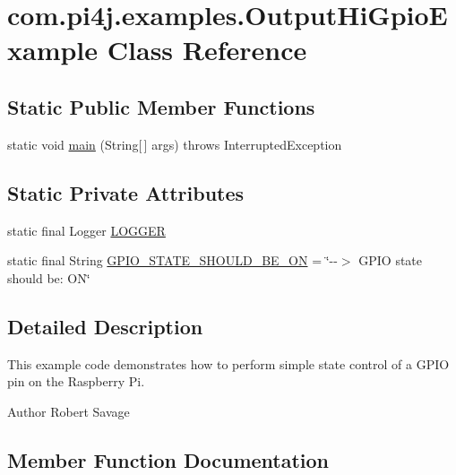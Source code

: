 \hypertarget{classcom_1_1pi4j_1_1examples_1_1OutputHiGpioExample}{}\section{com.\+pi4j.\+examples.\+Output\+Hi\+Gpio\+Example Class Reference}
\label{classcom_1_1pi4j_1_1examples_1_1OutputHiGpioExample}
\subsection*{Static Public Member Functions}
\begin{DoxyCompactItemize}
\item 
static void \hyperlink{classcom_1_1pi4j_1_1examples_1_1OutputHiGpioExample_aedee160245fc62352d20b9378af0dd24}{main} (String\mbox{[}$\,$\mbox{]} args)  throws Interrupted\+Exception 
\end{DoxyCompactItemize}
\subsection*{Static Private Attributes}
\begin{DoxyCompactItemize}
\item 
static final Logger \hyperlink{classcom_1_1pi4j_1_1examples_1_1OutputHiGpioExample_a6a7e1b255c583e81ad61ab6508479009}{L\+O\+G\+G\+E\+R}
\item 
static final String \hyperlink{classcom_1_1pi4j_1_1examples_1_1OutputHiGpioExample_a9b7e614693126092f294987ac29307b5}{G\+P\+I\+O\+\_\+\+S\+T\+A\+T\+E\+\_\+\+S\+H\+O\+U\+L\+D\+\_\+\+B\+E\+\_\+\+O\+N} = \char`\"{}-\/-\/$>$ G\+P\+I\+O state should be\+: O\+N\char`\"{}
\end{DoxyCompactItemize}


\subsection{Detailed Description}
This example code demonstrates how to perform simple state control of a G\+P\+I\+O pin on the Raspberry Pi.

\begin{DoxyAuthor}{Author}
Robert Savage 
\end{DoxyAuthor}


\subsection{Member Function Documentation}
\hypertarget{classcom_1_1pi4j_1_1examples_1_1OutputHiGpioExample_aedee160245fc62352d20b9378af0dd24}{}
